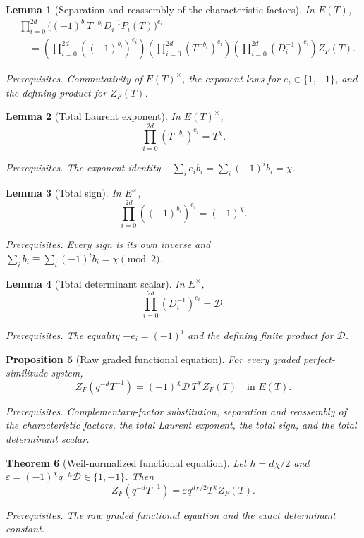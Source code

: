 \documentclass[10pt]{article}
\newtheorem{theorem}{Theorem}[section]
\newtheorem{proposition}[theorem]{Proposition}
\newtheorem{lemma}[theorem]{Lemma}
\theoremstyle{definition}
\newcommand{\deps}[1]{\par\smallskip\noindent\textit{Prerequisites.} #1}
\begin{document}
\begin{lemma}[Separation and reassembly of the characteristic factors]
In \(E(T)\),
\begin{align*}
 &\prod_{i=0}^{2d}
 \bigl((-1)^{b_i}T^{-b_i}D_i^{-1}P_i(T)\bigr)^{e_i}\\
 &\quad=
 \left(\prod_{i=0}^{2d}((-1)^{b_i})^{e_i}\right)
 \left(\prod_{i=0}^{2d}(T^{-b_i})^{e_i}\right)
 \left(\prod_{i=0}^{2d}(D_i^{-1})^{e_i}\right)Z_F(T).
\end{align*}
\deps{Commutativity of \(E(T)^\times\), the exponent laws for
\(e_i\in\{1,-1\}\), and the defining product for \(Z_F(T)\).}
\end{lemma}

\begin{lemma}[Total Laurent exponent]
In \(E(T)^\times\),
\[
 \prod_{i=0}^{2d}(T^{-b_i})^{e_i}=T^\chi.
\]
\deps{The exponent identity
\(-\sum_i e_i b_i=\sum_i(-1)^ib_i=\chi\).}
\end{lemma}

\begin{lemma}[Total sign]
In \(E^\times\),
\[
 \prod_{i=0}^{2d}((-1)^{b_i})^{e_i}=(-1)^\chi.
\]
\deps{Every sign is its own inverse and
\(\sum_i b_i\equiv\sum_i(-1)^ib_i=\chi\pmod2\).}
\end{lemma}

\begin{lemma}[Total determinant scalar]
In \(E^\times\),
\[
 \prod_{i=0}^{2d}(D_i^{-1})^{e_i}=\mathcal D.
\]
\deps{The equality \(-e_i=(-1)^i\) and the defining finite product for
\(\mathcal D\).}
\end{lemma}

\begin{proposition}[Raw graded functional equation]
For every graded perfect-similitude system,
\[
 \boxed{
 Z_F(q^{-d}T^{-1})
 =(-1)^\chi\mathcal D\,T^\chi Z_F(T)}
 \quad\text{in }E(T).
\]
\deps{Complementary-factor substitution, separation and reassembly of the
characteristic factors, the total Laurent exponent, the total sign, and the
total determinant scalar.}
\end{proposition}

\begin{theorem}[Weil-normalized functional equation]
Let \(h=d\chi/2\) and
\(\varepsilon=(-1)^\chi q^{-h}\mathcal D\in\{1,-1\}\).  Then
\[
 \boxed{
 Z_F(q^{-d}T^{-1})
 =\varepsilon q^{d\chi/2}T^\chi Z_F(T).}
\]
\deps{The raw graded functional equation and the exact determinant
constant.}
\end{theorem}
\end{document}
